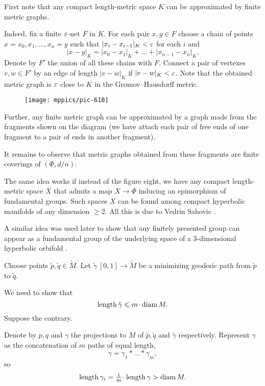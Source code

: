 First note that any compact length-metric space $K$ can be approximated by finite metric graphs.

Indeed, fix a finite $\varepsilon$-net $F$ in $K$.
For each pair $x,y\in F$ choose a chain of points $x=x_0,x_1,\dots, x_n=y$ such that
$|x_i-x_{i-1}|_K<\varepsilon$ for each $i$ and 
\[|x-y|_K=|x_0-x_1|_K+\dots+|x_{n-1}-x_n|_K.\]
Denote by $F'$ the union of all these chains with $F$.
Connect a pair of vertexes $v,w\in F'$ by an edge of length $|v-w|_K$ if $|v-w|_K<\varepsilon$.
Note that the obtained metric graph is $\varepsilon$ close to $K$ in the Gromov--Hausdorff metric.

\begin{wrapfigure}{o}{25 mm}
\vskip-3mm
\centering
\texttt{[image: mppics/pic-610]}
\vskip-3mm
\end{wrapfigure}

Further, any finite metric graph can be approximated by a graph made from the fragments shown on the diagram
(we have attach each pair of free ends of one fragment to a pair of ends in another fragment).

It remains to observe that metric graphs obtained from these fragments are finite coverings of $(\Phi,d/n)$.
\qeds


The same idea works if instead of the figure eight, we have any compact length-metric space $X$ that admits a map $X\to\Phi$ inducing an epimorphism of fundamental groups.
Such spaces $X$ can be found among compact hyperbolic manifolds of any dimension $\ge 2$.
All this is due to Vedrin Sahovic \cite{sahovic}.

A similar idea was used later to show that any finitely presented group can appear as a fundamental group of the underlying space of a 3-dimensional hyperbolic orbifold \cite{panov-petrunin-telescopic}.





Choose points $\tilde p,\tilde q\in\tilde M$.
Let  
$\tilde\gamma\:[0,1]\to \tilde M$ be a minimizing geodesic path from $\tilde p$ to $\tilde q$. 

We need to show that 
\[\length \tilde\gamma\le m\cdot \diam M.\]
Suppose the contrary.

Denote by $p,q$ and $\gamma$ the projections to $M$ of $\tilde p,\tilde q$ and $\tilde \gamma$ respectively. 
Represent $\gamma$
as the concatenation of $m$ paths of equal length,
\[\gamma=\gamma_1{*}\dots{*}\gamma_m,\] 
so
\[\length\gamma_i=\tfrac{1}m\cdot\length\gamma>\diam M.\] 

